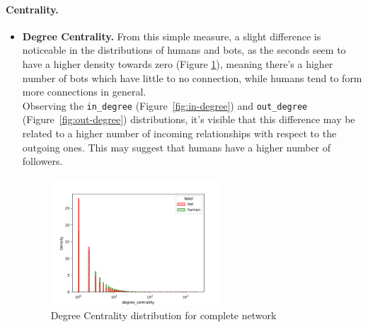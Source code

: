 \documentclass[12pt, a4paper]{article}
\begin{document}
    	\paragraph{Centrality.}
		\begin{itemize}
			\item \textbf{Degree Centrality.} From this simple measure, a slight difference is noticeable in the distributions of humans and bots, as the seconds seem to have a higher density towards zero (Figure \ref{fig:degree_centrality}), meaning there's a higher number of bots which have little to no connection, while humans tend to form more connections in general.\\
				Observing the \texttt{in\_degree} (Figure~\ref{fig:in-degree}) and \texttt{out\_degree} (Figure~\ref{fig:out-degree}) distributions, it's visible that this difference may be related to a higher number of incoming relationships with respect to the outgoing ones. This may suggest that humans have a higher number of followers.
                \begin{figure}[H]
                	\centering
                    \includegraphics[width=0.6\textwidth]{complete_degree_centrality_distribution.png}
                    \caption{Degree Centrality distribution for complete network}
                    \label{fig:degree_centrality}
                \end{figure}
				\begin{figure}[H]
    				\centering
    				\setlength{\fboxsep}{0pt}
    				\setlength{\fboxrule}{0.5pt}

\end{figure}
\end{itemize}
\end{document}
